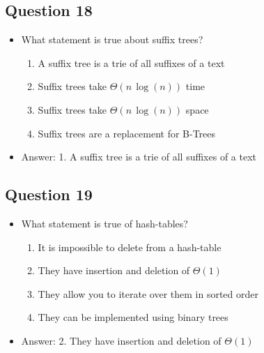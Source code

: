 \begin{slide}
\section[-1]{Question 18}

\begin{PauseHighLight}
  \begin{itemize}
  \item What statement is true about suffix trees?
    \begin{enumerate}
    \item A suffix tree is a trie of all suffixes of a text
    \item Suffix trees take $\Theta(n\,\log(n))$ time
    \item Suffix trees take $\Theta(n\,\log(n))$ space
    \item Suffix trees are a replacement for B-Trees\pause
    \end{enumerate}
  \item Answer: 1. A suffix tree is a trie of all suffixes of a text\pauseb
  \end{itemize}
\end{PauseHighLight}
\end{slide}

\begin{slide}
\section[-1]{Question 19}

\begin{PauseHighLight}
  \begin{itemize}
  \item What statement is true of hash-tables?
    \begin{enumerate}
    \item It is impossible to delete from a hash-table
    \item They have insertion and deletion of $\Theta(1)$
    \item They allow you to iterate over them in sorted order
    \item They can be implemented using binary trees\pause
    \end{enumerate}
  \item Answer: 2. They have insertion and deletion of $\Theta(1)$\pauseb
  \end{itemize}
\end{PauseHighLight}
\end{slide}

